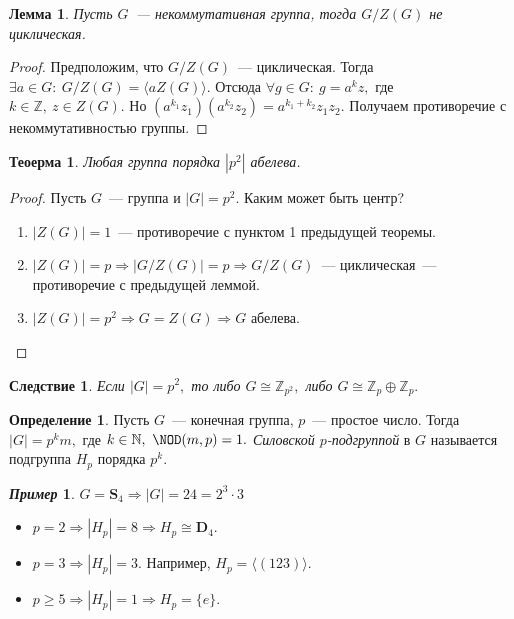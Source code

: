 \documentclass[a4paper, 14pt]{extarticle}
\newcommand{\integers}{\mathbb{Z}}
\newcommand{\naturals}{\mathbb{N}}
\newcommand{\dihedral}{\mathbf{D}}
\newcommand{\symmetrical}{\mathbf{S}}
\newcommand{\suchthat}{{:}{ } \ }
\theoremstyle{definition}
\newtheorem*{exmpl*}{\textit{Пример}}
\newtheorem{definition}{Определение}
\theoremstyle{plain}
\newtheorem{theorem}{Теоерма}
\numberwithin{theorem}{section}
\numberwithin{definition}{section}
\numberwithin{statement}{section}
\newtheorem{lemma}{Лемма}
\numberwithin{lemma}{section}
\newtheorem*{consequence*}{Следствие}
\numberwithin{consequence}{section}
\begin{document}
        \begin{lemma}
            Пусть $G$~--- некоммутативная группа, тогда ${G/Z(G)}$ не циклическая.
        \end{lemma}
        \begin{proof}
            Предположим, что ${G/Z(G)}$~--- циклическая. Тогда ${\exists a \in G\suchthat G/Z(G) = \langle aZ(G) \rangle.}$ Отсюда ${\forall g \in G\suchthat g = a^kz,}$ где ${k \in \integers, \ z \in Z(G).}$ Но ${(a^{k_1}z_1)(a^{k_2}z_2) = a^{k_1+k_2}z_1z_2.}$ Получаем противоречие с некоммутативностью группы.
        \end{proof}
        \newpage
        \begin{theorem}
            Любая группа порядка $|p^2|$ абелева.
        \end{theorem}
        \begin{proof}
            Пусть $G$~--- группа и ${|G| = p^2.}$ Каким может быть центр?
            \begin{enumerate}
            \setlength\itemsep{0.1em}
                \item ${|Z(G)| = 1}$~--- противоречие с пунктом 1 предыдущей теоремы.
                \item ${|Z(G)| = p \Rightarrow |G/Z(G)| = p \Rightarrow G/Z(G)}$~--- циклическая~--- противоречие с предыдущей леммой.
                \item ${|Z(G)| = p^2 \Rightarrow G = Z(G) \Rightarrow G}$ абелева. \qedhere
            \end{enumerate}
        \end{proof}
        \begin{consequence*}
            Если ${|G| = p^2,}$ то либо ${G \cong \integers_{p^2},}$ либо ${G \cong \integers_p \oplus \integers_p.}$
        \end{consequence*}
        \begin{definition}
            Пусть $G$~--- конечная группа, $p$~--- простое число. Тогда ${|G| = p^km,}$ где ${k \in \naturals, \ \NOD(m,p) = 1.}$ \textit{Силовской $p$-подгруппой} в $G$ называется подгруппа $H_p$ порядка $p^k$.
        \end{definition}
        \begin{exmpl*}
            ${G = \symmetrical_4 \Rightarrow |G| = 24 = 2^3 \cdot 3}$
            \begin{itemize}
            \setlength\itemsep{0.1em}
                \item ${p = 2 \Rightarrow |H_p| = 8 \Rightarrow H_p \cong \dihedral_4.}$
                \item ${p = 3 \Rightarrow |H_p| = 3.}$ Например, ${H_p = \langle(123)\rangle.}$
                \item ${p \geqslant 5 \Rightarrow |H_p| = 1 \Rightarrow H_p = \{e\}.}$
            \end{itemize}
        \end{exmpl*}
\end{document}
